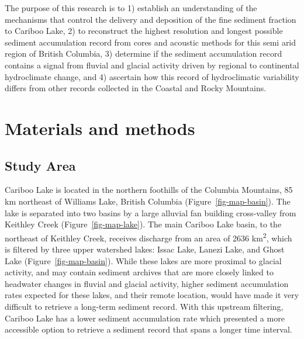 \documentclass[
  letterpaper,
  DIV=11,
  numbers=noendperiod]{scrartcl}
\begin{document}
The purpose of this research is to 1) establish an understanding of the
mechanisms that control the delivery and deposition of the fine sediment
fraction to Cariboo Lake, 2) to reconstruct the highest resolution and
longest possible sediment accumulation record from cores and acoustic
methods for this semi arid region of British Columbia, 3) determine if
the sediment accumulation record contains a signal from fluvial and
glacial activity driven by regional to continental hydroclimate change,
and 4) ascertain how this record of hydroclimatic variability differs
from other records collected in the Coastal and Rocky Mountains.

\hypertarget{materials-and-methods}{%
\section{Materials and methods}\label{materials-and-methods}}

\hypertarget{study-area}{%
\subsection{Study Area}\label{study-area}}

Cariboo Lake is located in the northern foothills of the Columbia
Mountains, 85 km northeast of Williams Lake, British Columbia
(Figure~\ref{fig-map-basin}). The lake is separated into two basins by a
large alluvial fan building cross-valley from Keithley Creek
(Figure~\ref{fig-map-lake}). The main Cariboo Lake basin, to the
northeast of Keithley Creek, receives discharge from an area of 2636
km\textsuperscript{2}, which is filtered by three upper watershed lakes:
Issac Lake, Lanezi Lake, and Ghost Lake (Figure~\ref{fig-map-basin}).
While these lakes are more proximal to glacial activity, and may contain
sediment archives that are more closely linked to headwater changes in
fluvial and glacial activity, higher sediment accumulation rates
expected for these lakes, and their remote location, would have made it
very difficult to retrieve a long-term sediment record. With this
upstream filtering, Cariboo Lake has a lower sediment accumulation rate
which presented a more accessible option to retrieve a sediment record
that spans a longer time interval.
\end{document}

